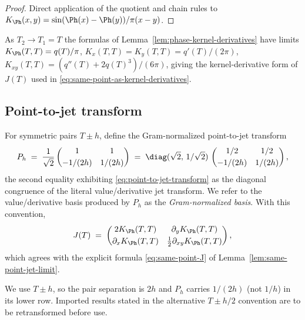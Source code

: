 \begin{proof}
Direct application of the quotient and chain rules to
\(K_\Ph(x,y) = \sin(\Ph(x)-\Ph(y))/\pi(x-y)\).
\end{proof}

\begin{remark}
\label{rem:kernel-derivatives-diagonal}
As \(T_2\to T_1 = T\) the formulas of
Lemma~\ref{lem:phase-kernel-derivatives} have limits
\(K_\Ph(T,T) = q(T)/\pi\),
\(K_x(T,T) = K_y(T,T) = q'(T)/(2\pi)\),
\(K_{xy}(T,T) = (q''(T) + 2q(T)^3)/(6\pi)\),
giving the kernel-derivative form of \(J(T)\) used in
\eqref{eq:same-point-as-kernel-derivatives}.
\end{remark}

\subsection{Point-to-jet transform}
\label{subsec:point-to-jet-transform}

For symmetric pairs \(T\pm h\), define the Gram-normalized
point-to-jet transform
\begin{equation}
\label{eq:point-to-jet-transform}
P_h
\;=\;
\frac1{\sqrt2}
\begin{pmatrix}
1 & 1\\[0.6ex]
-1/(2h) & 1/(2h)
\end{pmatrix}
\;=\;
\diag(\sqrt 2,\, 1/\sqrt 2)\,
\begin{pmatrix}
1/2 & 1/2\\[0.6ex]
-1/(2h) & 1/(2h)
\end{pmatrix},
\end{equation}
the second equality exhibiting \eqref{eq:point-to-jet-transform} as
the diagonal congruence of the literal value/derivative jet
transform.  We refer to the value/derivative basis produced by
\(P_h\) as the \emph{Gram-normalized basis}.  With this convention,
\begin{equation}
\label{eq:same-point-as-kernel-derivatives}
J(T)
\;=\;
\begin{pmatrix}
2K_\Ph(T,T) & \partial_y K_\Ph(T,T)\\[0.6ex]
\partial_x K_\Ph(T,T) & \tfrac12 \partial_{xy} K_\Ph(T,T)
\end{pmatrix},
\end{equation}
which agrees with the explicit formula
\eqref{eq:same-point-J} of
Lemma~\ref{lem:same-point-jet-limit}.

\begin{remark}
\label{rem:pair-separation-convention}
We use \(T\pm h\), so the pair separation is \(2h\) and
\(P_h\) carries \(1/(2h)\) (not \(1/h\)) in its lower row.  Imported
results stated in the alternative \(T\pm h/2\) convention are to be
retransformed before use.
\end{remark}

